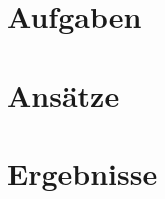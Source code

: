 \documentclass
[
  draft    = true,
  fontsize = 11pt,
  parskip  = half-,
  BCOR     = 0pt,
  DIV      = 11,
  ngerman,
  dvipsnames
]
{scrbook}
\begin{document}


\tableofcontents

\cleardoublepage
{}

\newcommand{\subdir}{}


\chapter{Aufgaben}

\chapter{Ansätze}

\chapter{Ergebnisse}

\end{document}
